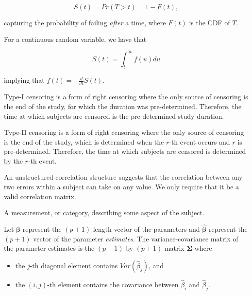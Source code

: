 \documentclass[
  letterpaper,
  DIV=11,
  numbers=noendperiod]{scrreprt}
\providecommand{\tightlist}{%
  \setlength{\itemsep}{0pt}\setlength{\parskip}{0pt}}\usepackage{longtable,booktabs,array}
\theoremstyle{definition}
\theoremstyle{definition}
\theoremstyle{remark}
\begin{document}
\[S(t) = Pr(T > t) = 1 - F(t),\]

capturing the probability of failing \emph{after} a time, where \(F(t)\)
is the CDF of \(T\).

For a continuous random variable, we have that

\[S(t) = \int_{t}^{\infty} f(u) du\]

implying that \(f(t) = -\frac{d}{dt} S(t)\).

\begin{description}
\tightlist
\item[Type I Censoring (Definition~\ref{def-type-1-censoring})]
Type-I censoring is a form of right censoring where the only source of
censoring is the end of the study, for which the duration was
pre-determined. Therefore, the time at which subjects are censored is
the pre-determined study duration.
\item[Type II Censoring (Definition~\ref{def-type-2-censoring})]
Type-II censoring is a form of right censoring where the only source of
censoring is the end of the study, which is determined when the \(r\)-th
event occurs and \(r\) is pre-determined. Therefore, the time at which
subjects are censored is determined by the \(r\)-th event.
\item[Unstructured Correlation Structure
(Definition~\ref{def-unstructured-correlation-structure})]
An unstructured correlation structure suggests that the correlation
between any two errors within a subject can take on any value. We only
require that it be a valid correlation matrix.
\item[Variable (Definition~\ref{def-variable})]
A measurement, or category, describing some aspect of the subject.
\item[Variance-Covariance Matrix
(Definition~\ref{def-variance-covariance-matrix})]
Let \(\boldsymbol{\beta}\) represent the \((p+1)\)-length vector of the
parameters and \(\widehat{\boldsymbol{\beta}}\) represent the \((p+1)\)
vector of the parameter \emph{estimates}. The variance-covariance matrix
of the parameter estimates is the \((p+1)\)-by-\((p+1)\) matrix
\(\boldsymbol{\Sigma}\) where
\end{description}

\begin{itemize}
\tightlist
\item
  the \(j\)-th diagonal element contains
  \(Var\left(\widehat{\beta}_j\right)\), and
\item
  the \((i,j)\)-th element contains the covariance between
  \(\widehat{\beta}_i\) and \(\widehat{\beta}_j\).
\end{itemize}
\end{document}
